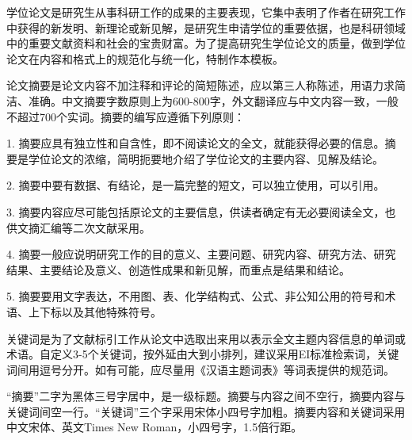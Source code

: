 \documentclass{cqupt_thesis}
\begin{document}



    \makecover %
    \makestatement %


    \begin{cnabstract}

        学位论文是研究生从事科研工作的成果的主要表现，它集中表明了作者在研究工作中获得的新发明、新理论或新见解，是研究生申请学位的重要依据，也是科研领域中的重要文献资料和社会的宝贵财富。为了提高研究生学位论文的质量，做到学位论文在内容和格式上的规范化与统一化，特制作本模板。
        
        论文摘要是论文内容不加注释和评论的简短陈述，应以第三人称陈述，用语力求简洁、准确。中文摘要字数原则上为600-800字，外文翻译应与中文内容一致，一般不超过700个实词。摘要的编写应遵循下列原则：

        1. 摘要应具有独立性和自含性，即不阅读论文的全文，就能获得必要的信息。摘要是学位论文的浓缩，简明扼要地介绍了学位论文的主要内容、见解及结论。

        2. 摘要中要有数据、有结论，是一篇完整的短文，可以独立使用，可以引用。

        3. 摘要内容应尽可能包括原论文的主要信息，供读者确定有无必要阅读全文，也供文摘汇编等二次文献采用。

        4. 摘要一般应说明研究工作的目的意义、主要问题、研究内容、研究方法、研究结果、主要结论及意义、创造性成果和新见解，而重点是结果和结论。

        5. 摘要要用文字表达，不用图、表、化学结构式、公式、非公知公用的符号和术语、上下标以及其他特殊符号。

        关键词是为了文献标引工作从论文中选取出来用以表示全文主题内容信息的单词或术语。自定义3-5个关键词，按外延由大到小排列，建议采用EI标准检索词，关键词间用逗号分开。如有可能，应尽量用《汉语主题词表》等词表提供的规范词。

        “摘要”二字为黑体三号字居中，是一级标题。摘要与内容之间不空行，摘要内容与关键词间空一行。“关键词”三个字采用宋体小四号字加粗。摘要内容和关键词采用中文宋体、英文Times New Roman，小四号字，1.5倍行距。

    \end{cnabstract}
\end{document}
